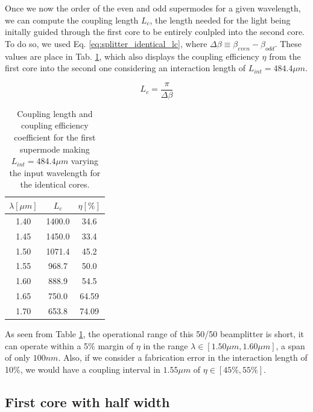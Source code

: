 \documentclass[conference, a4paper]{IEEEtran}
\begin{document}
Once we now the order of the even and odd supermodes for a given wavelength, we can compute the coupling length $L_c$, the length needed for the light being initally guided through the first core to be entirely coulpled into the second core. To do so, we used Eq. \eqref{eq:splitter_identical_lc}, where $\Delta \beta \equiv \beta_{even} - \beta_{odd}$. These values are place in Tab. \ref{tab:splitter_identical_lc}, which also displays the coupling efficiency $\eta$ from the first core into the second one considering an interaction length of $L_{int} = 484.4\mu m$.

\begin{equation}
    L_c = \frac{\pi}{\Delta \beta}
    \label{eq:splitter_identical_lc}
\end{equation}

\begin{table}[H]
    \centering
    \begin{tabular}{ccc}
        \toprule
        $\lambda [\mu m]$ & $L_c$ & $\eta[\%]$ \\
        \midrule
        1.40 & 1400.0 & 34.6 \\
        1.45 & 1450.0 & 33.4 \\
        1.50 & 1071.4 & 45.2 \\
        1.55 & 968.7 & 50.0 \\
        1.60 & 888.9 & 54.5 \\
        1.65 & 750.0 & 64.59 \\
        1.70 & 653.8 & 74.09 \\    
        \bottomrule
    \end{tabular}
    \caption{Coupling length and coupling efficiency coefficient for the first supermode making $L_{int} = 484.4\mu m$ varying the input wavelength for the identical cores.}
    \label{tab:splitter_identical_lc}
\end{table}

As seen from Table \ref{tab:splitter_identical_lc}, the operational range of this 50/50 beamplitter is short, it can operate within a 5\% margin of $\eta$ in the range $\lambda \in [1.50\mu m, 1.60\mu m]$, a span of only $100nm$. Also, if we consider a fabrication error in the interaction length of 10\%, we would have a coupling interval in $1.55 \mu m$ of $\eta \in [45\%, 55\%]$.  

\subsection{First core with half width}
\label{subsec:splitter_doubled}
\end{document}
